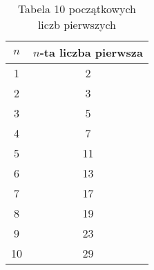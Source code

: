 \begin{table}[h!]
    \centering
    \begin{tabular}{|c|c|}
        \hline
        \( n \) & \( n \)-ta liczba pierwsza \\
        \hline
        1 & 2 \\
        2 & 3 \\
        3 & 5 \\
        4 & 7 \\
        5 & 11 \\
        6 & 13 \\
        7 & 17 \\
        8 & 19 \\
        9 & 23 \\
        10 & 29 \\
        \hline
    \end{tabular}
    \caption{Tabela 10 początkowych liczb pierwszych}
    \label{tab:prime_numbers}
\end{table}